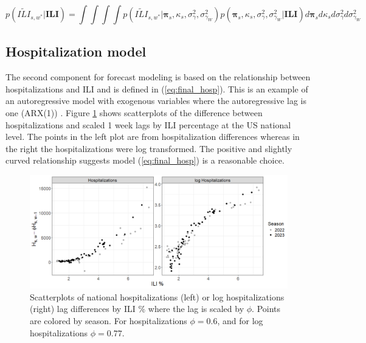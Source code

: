 \documentclass[ba]{imsart}
\theoremstyle{plain}
\theoremstyle{definition}
\theoremstyle{remark}
\begin{document}
\begin{equation}
    \label{eq:ili_post}
    p(\widetilde{ILI}_{s,w^*} | \textbf{ILI}) = \int \int \int \int p(\widetilde{ILI}_{s,w^*} | \boldsymbol{\pi}_s, \kappa_s, \sigma^2_{\gamma}, \sigma^2_{\gamma_W}) p(\boldsymbol{\pi}_s, \kappa_s, \sigma^2_{\gamma}, \sigma^2_{\gamma_W} | \textbf{ILI}) d\boldsymbol{\pi}_s d \kappa_s d \sigma^2_{\gamma} d \sigma^2_{\gamma_W}
\end{equation}





\subsection{Hospitalization model} \label{sec:hospital_model}

The second component for forecast modeling is based on the relationship between hospitalizations and ILI and is defined in (\ref{eq:final_hosp}).
This is an example of an autoregressive model with exogenous variables where the autoregressive lag is one (ARX(1)) \cite[]{raftery2010online,ljung1987system}. Figure \ref{fig:lag_scatter}
shows scatterplots of the difference between hospitalizations and scaled 1 week 
lags by ILI percentage at the US national level. The points in the left plot are
from hospitalization differences whereas in the right the hospitalizations were
log transformed. The positive and slightly curved relationship suggests model
(\ref{eq:final_hosp}) is a reasonable choice.

\begin{figure}
    \includegraphics[scale=.46]{Images/lagdiff_vs_ili.png}
    \caption{Scatterplots of national hospitalizations (left) or log hospitalizations (right) lag differences by ILI \% where the lag is scaled by $\phi$. Points are colored by season. For hospitalizations $\phi = 0.6$, and for log hospitalizations $\phi = 0.77$. }
    \label{fig:lag_scatter}
\end{figure}
\end{document}
